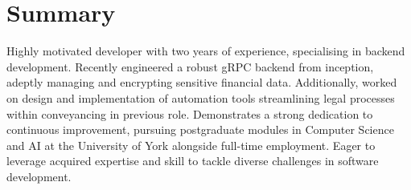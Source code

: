 \documentclass{article}
\begin{document}
\section{Summary}
Highly motivated developer with two years of experience, specialising in backend development. Recently engineered a robust gRPC backend from inception, adeptly managing and encrypting sensitive financial data. Additionally, worked on design and implementation of automation tools streamlining legal processes within conveyancing in previous role. Demonstrates a strong dedication to continuous improvement, pursuing postgraduate modules in Computer Science and AI at the University of York alongside full-time employment. Eager to leverage acquired expertise and skill to tackle diverse challenges in software development.
\end{document}
